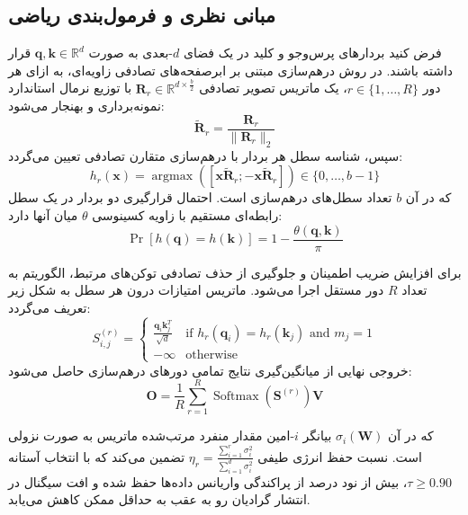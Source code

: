 \subsection{مبانی نظری و فرمول‌بندی ریاضی}
فرض کنید بردارهای پرس‌وجو و کلید در یک فضای $d$-بعدی به صورت $\mathbf{q}, \mathbf{k} \in \mathbb{R}^d$ قرار داشته باشند. در روش درهم‌سازی مبتنی بر ابرصفحه‌های تصادفی زاویه‌ای، به ازای هر دور $r \in \{1, \dots, R\}$، یک ماتریس تصویر تصادفی $\mathbf{R}_r \in \mathbb{R}^{d \times \frac{b}{2}}$ با توزیع نرمال استاندارد نمونه‌برداری و بهنجار می‌شود:
\begin{equation}
\tilde{\mathbf{R}}_r = \frac{\mathbf{R}_r}{\|\mathbf{R}_r\|_2}
\end{equation}
سپس، شناسه سطل هر بردار با درهم‌سازی متقارن تصادفی تعیین می‌گردد:
\begin{equation}
h_r(\mathbf{x}) = \operatorname{argmax}\left( [\mathbf{x} \tilde{\mathbf{R}}_r ; -\mathbf{x} \tilde{\mathbf{R}}_r] \right) \in \{0, \dots, b - 1\}
\end{equation}
که در آن $b$ تعداد سطل‌های درهم‌سازی است. احتمال قرارگیری دو بردار در یک سطل رابطه‌ای مستقیم با زاویه کسینوسی $\theta$ میان آنها دارد:
\begin{equation}
\Pr[h(\mathbf{q}) = h(\mathbf{k})] = 1 - \frac{\theta(\mathbf{q}, \mathbf{k})}{\pi}
\end{equation}

برای افزایش ضریب اطمینان و جلوگیری از حذف تصادفی توکن‌های مرتبط، الگوریتم به تعداد $R$ دور مستقل اجرا می‌شود. ماتریس امتیازات درون هر سطل به شکل زیر تعریف می‌گردد:
\begin{equation}
S_{i, j}^{(r)} = \begin{cases}
\frac{\mathbf{q}_i \mathbf{k}_j^T}{\sqrt{d}} & \text{if } h_r(\mathbf{q}_i) = h_r(\mathbf{k}_j) \text{ and } m_j = 1 \\
-\infty & \text{otherwise}
\end{cases}
\end{equation}
خروجی نهایی از میانگین‌گیری نتایج تمامی دورهای درهم‌سازی حاصل می‌شود:
\begin{equation}
\mathbf{O} = \frac{1}{R} \sum_{r=1}^R \operatorname{Softmax}\left(\mathbf{S}^{(r)}\right) \mathbf{V}
\end{equation}

که در آن $\sigma_i(\mathbf{W})$ بیانگر $i$-امین مقدار منفرد مرتب‌شده ماتریس به صورت نزولی است. نسبت حفظ انرژی طیفی $\eta_r = \frac{\sum_{i=1}^r \sigma_i^2}{\sum_{i=1}^{d} \sigma_i^2}$ تضمین می‌کند که با انتخاب آستانه $\tau \ge 0.90$، بیش از نود درصد از پراکندگی واریانس داده‌ها حفظ شده و افت سیگنال در انتشار گرادیان رو به عقب به حداقل ممکن کاهش می‌یابد.

